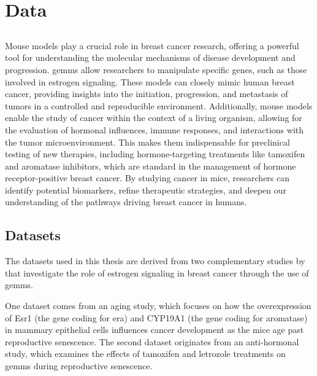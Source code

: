 \section{Data}
\label{sec:data}

\subsection{}
\label{sec:mouse_models}
Mouse models play a crucial role in breast cancer research, offering a powerful
tool for understanding the molecular mechanisms of disease development and
progression.
\Glspl{gemm} allow researchers to manipulate specific genes, such as those
involved in estrogen signaling\supercite{park_mouse_2018}.
These models can closely mimic human breast cancer, providing insights into the
initiation, progression, and metastasis of tumors in a controlled and
reproducible environment\supercite{pfefferle_transcriptomic_2013}.
Additionally, mouse models enable the study of cancer within the context of a
living organism, allowing for the evaluation of hormonal influences, immune
responses, and interactions with the tumor
microenvironment\supercite{manning_mouse_2016}.
This makes them indispensable for preclinical testing of new therapies,
including hormone-targeting treatments like tamoxifen and aromatase inhibitors,
which are standard in the management of hormone receptor-positive breast
cancer\supercite{fan_endocrine_2015,yin_disruption_2014}.
By studying cancer in mice, researchers can identify potential biomarkers,
refine therapeutic strategies, and deepen our understanding of the pathways
driving breast cancer in humans\supercite{peterson_amphiregulin_2015}.

\subsection{Datasets}
\label{sec:datasets}
The datasets used in this thesis are derived from two complementary studies by
\textcite{furth_esr1_2023,furth_overexpression_2023} that investigate the role
of estrogen signaling in breast cancer through the use of \glspl{gemm}.

One dataset comes from an aging study, which focuses on how the overexpression
of Esr1 (the gene coding for \gls{era}) and CYP19A1 (the gene coding for
aromatase) in mammary epithelial cells influences cancer development as the
mice age past reproductive senescence.
The second dataset originates from an anti-hormonal study, which examines the
effects of tamoxifen and letrozole treatments on \glspl{gemm} during
reproductive senescence.

